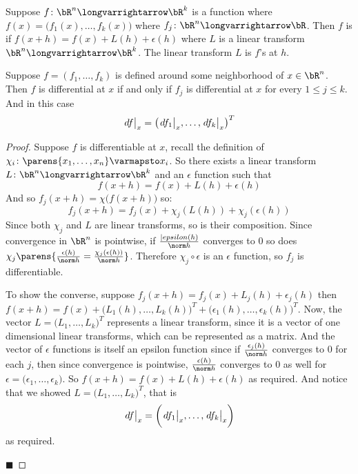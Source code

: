 \documentclass[10pt]{article}
\def\differ#1#2{\left.d#1\strut\right|_{#2}}
\begin{document}
\begin{defn*}

    Suppose $f\colon\bR^n\longvarrightarrow\bR^k$ is a function where $f(x)=\bigl(f_1(x),\dots,f_k(x)\bigr)$ where $f_j\colon\bR^n\longvarrightarrow\bR$.
    Then $f$ is  if $f(x+h)=f(x)+L(h)+\epsilon(h)$ where $L$ is a linear transform $\bR^n\longvarrightarrow\bR^k$.
    The linear transform $L$ is $f$'s  at $h$.

\end{defn*}

\begin{prop*}

    Suppose $f=(f_1,\dots,f_k)$ is defined around some neighborhood of $x\in\bR^n$.
    Then $f$ is differential at $x$ if and only if $f_j$ is differential at $x$ for every $1\leq j\leq k$.
    And in this case
    \[ \differ fx = \bigl(\differ{f_1}x,\dots,\differ{f_k}x\bigr)^T \]

\end{prop*}

\begin{proof}

    Suppose $f$ is differentiable at $x$, recall the definition of $\chi_i\colon\parens{x_1,\dots,x_n}\varmapsto x_i$.
    So there exists a linear transform $L\colon\bR^n\longvarrightarrow\bR^k$ and an $\epsilon$ function such that
    \[ f(x+h) = f(x) + L(h) + \epsilon(h) \]
    And so $f_j(x+h)=\chi\bigl(f(x+h)\bigr)$ so:
    \[ f_j(x+h) = f_j(x) + \chi_j(L(h)) + \chi_j(\epsilon(h)) \]
    Since both $\chi_j$ and $L$ are linear transforms, so is their composition.
    Since convergence in $\bR^n$ is pointwise, if $\frac{|epsilon(h)}{\norm h}$ converges to $0$ so does $\chi_j\parens{\frac{\epsilon(h)}{\norm h}=\frac{\chi_j(\epsilon(h))}{\norm h}}$.
    Therefore $\chi_j\circ\epsilon$ is an $\epsilon$ function, so $f_j$ is differentiable.

    To show the converse, suppose $f_j(x+h)=f_j(x)+L_j(h)+\epsilon_j(h)$ then $f(x+h)=f(x)+\bigl(L_1(h),\dots,L_k(h)\bigr)^T+\bigl(\epsilon_1(h),\dots,\epsilon_k(h)\bigr)^T$.
    Now, the vector $L=\bigl(L_1,\dots,L_k\bigr)^T$ represents a linear transform, since it is a vector of one dimensional linear transforms, which can be represented as a matrix.
    And the vector of $\epsilon$ functions is itself an epsilon function since if $\frac{\epsilon_j(h)}{\norm h}$ converges to $0$ for each $j$, then since convergence is pointwise,
    $\frac{\epsilon(h)}{\norm h}$ converges to $0$ as well for $\epsilon=\bigl(\epsilon_1,\dots,\epsilon_k\bigr)$.
    So $f(x+h)=f(x)+L(h)+\epsilon(h)$ as required.
    And notice that we showed $L=\bigl(L_1,\dots,L_k\bigr)^T$, that is
    \[ \differ fx = \biggl(\differ{f_1}x,\dots,\differ{f_k}x\biggr) \]
    as required.

    \hfill$\blacksquare$

\end{proof}
\end{document}
